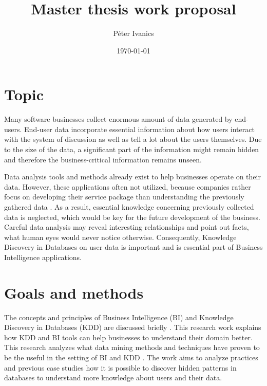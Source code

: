 \documentclass[english]{tktltiki}
\begin{document}
\onehalfspacing

\title{Master thesis work proposal}
\author{P\'eter Ivanics}

\date{\today}

\maketitle

%
%
%

\section{Topic}
	Many software businesses collect enormous amount of data generated by end-users. End-user data incorporate essential information about how users interact with the system of discussion as well as tell a lot about the users themselves. Due to the size of the data, a significant part of the information might remain hidden and therefore the business-critical information remains unseen. 
	
	Data analysis tools and methods already exist to help businesses operate on their data. However, these applications often not utilized, because companies rather focus on developing their service package than understanding the previously gathered data \cite{inmon2007tapping}. As a result, essential knowledge concerning previously collected data is neglected, which would be key for the future development of the business. Careful data analysis may reveal interesting relationships and point out facts, what human eyes would never notice otherwise. Consequently, Knowledge Discovery in Databases on user data is important and is essential part of Business Intelligence applications. 

\section{Goals and methods}
	The concepts and principles of Business Intelligence (BI) and Knowledge Discovery in Databases (KDD) are discussed briefly \cite{data_mining_and_knowledge_discovery}. This research work explains how KDD and BI tools can help businesses to understand their domain better. This research analyzes what data mining methods and techniques have proven to be the useful in the setting of BI and KDD \cite{bose2001business}. The work aims to analyze practices and previous case studies how it is possible to discover hidden patterns in databases to understand more knowledge about users and their data. 
	
\end{document}

